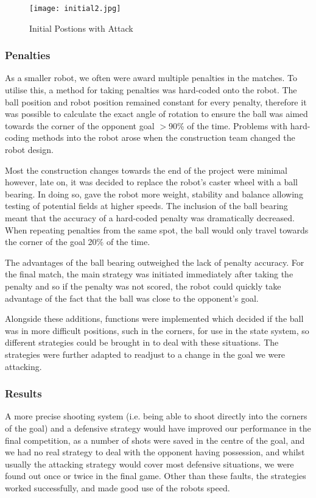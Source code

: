 \begin{figure}[htp]
\begin{center}
\leavevmode
\texttt{[image: initial2.jpg]}
\end{center}
\caption{Initial Postions with Attack}
\label{fig:initial2}
\end{figure}

\subsubsection{Penalties}
As a smaller robot, we often were award multiple penalties in the matches. To utilise this, a method for taking penalties was hard-coded onto the robot. The ball position and robot position remained constant for every penalty, therefore it was possible to calculate the exact angle of rotation to ensure the ball was aimed towards the corner of the opponent goal $>$90\% of the time. Problems with hard-coding methods into the robot arose when the construction team changed the robot design. \linebreak

Most the construction changes towards the end of the project were minimal however, late on, it was decided to replace the robot's caster wheel with a ball bearing. In doing so, gave the robot more weight, stability and balance allowing testing of potential fields at higher speeds. The inclusion of the ball bearing meant that the accuracy of a hard-coded penalty was dramatically decreased. When repeating penalties from the same spot, the ball would only travel towards the corner of the goal 20\% of the time.\linebreak

The advantages of the ball bearing outweighed the lack of penalty accuracy. For the final match, the main strategy was initiated immediately after taking the penalty and so if the penalty was not scored, the robot could quickly take advantage of the fact that the ball was close to the opponent's goal.\linebreak

Alongside these additions, functions were implemented which decided if the ball was in more difficult positions, such in the corners, for use in the state system, so different strategies could be brought in to deal with these situations. The strategies were further adapted to readjust to a change in the goal we were attacking. \linebreak

\subsubsection{Results}
A more precise shooting system (i.e. being able to shoot directly into the corners of the goal) and a defensive strategy would have improved our performance in the final competition, as a number of shots were saved in the centre of the goal, and we had no real strategy to deal with the opponent having possession, and whilst usually the attacking strategy would cover most defensive situations, we were found out once or twice in the final game. Other than these faults, the strategies worked successfully, and made good use of the robots speed.

